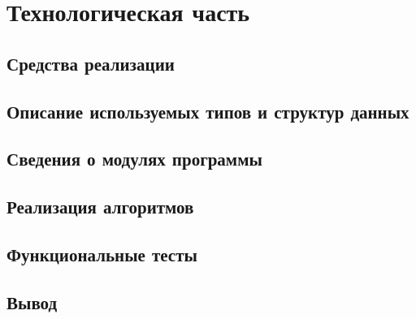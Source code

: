 \section{Технологическая часть}

\subsection{Средства реализации}


\subsection{Описание используемых типов и структур данных}

\subsection{Сведения о модулях программы}


\subsection{Реализация алгоритмов}


\subsection{Функциональные тесты}


\subsection*{Вывод}

